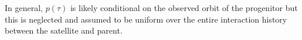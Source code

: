 \documentclass[letterpaper,12pt,preprint]{aastex}
\newcommand{\given}{\,|\,}
\newcommand{\jac}[1]{\left\vert \J{#1} \right\vert}
\newcommand{\D}{{\bf D}}
\newcommand{\W}{{\bf W}}
\newcommand{\J}{{\boldsymbol J}}
\newcommand{\bSigma}{{\bf \Sigma}}
\newcommand{\bsigma}{\boldsymbol\sigma}
\begin{document}

In general, $p(\tau)$ is likely conditional on the observed orbit of the progenitor but this is neglected and assumed to be uniform over the entire interaction history between the satellite and parent.





\end{document}
